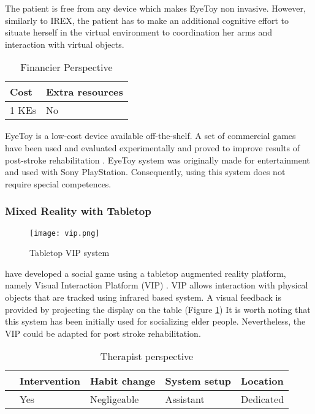 \documentclass[preprint,authoryear,12pt]{elsarticle}
\begin{document}
The patient is free from any device which makes EyeToy non invasive. However, similarly to IREX, the patient has to make an additional cognitive effort to situate herself in the virtual environment to coordination her arms and interaction with virtual objects.

\begin{table}[h]
\caption{Financier Perspective}
\center
\label{tab:finaper}
\begin{tabular}{|l|l|}
\hline
 Cost & Extra resources \\
\hline
 1 KEs &  No\\
\hline
\end{tabular}
\end{table}

EyeToy is a low-cost device available off-the-shelf. A set of commercial games have been used and evaluated experimentally and proved to improve results of post-stroke rehabilitation \citep{Yavuzer2008}. EyeToy system was originally made for entertainment and used with Sony PlayStation. Consequently, using this system does not require special competences.


\par
\subsubsection{Mixed Reality with Tabletop}
\par



\begin{figure}[h]
	\centering
\texttt{[image: vip.png]}
\caption{Tabletop VIP system \citep{AlMahmud2008}}
	\label{fig:vip}
\end{figure}
\citep{AlMahmud2008} have developed a social game using a tabletop augmented reality platform, namely Visual Interaction Platform (VIP) \citep{Aliakseyeu2001}. VIP allows interaction with physical objects that are tracked using infrared based system. A visual feedback is provided by projecting the display on the table (Figure \ref{fig:vip}) It is worth noting that this system has been initially used for socializing elder people. Nevertheless, the VIP could be adapted for post stroke rehabilitation.

\begin{table}[h]
\caption{Therapist perspective}
\center
\label{tab:theraper}
\begin{tabular}{|l|l|l|l|l|}
\hline
& Intervention & Habit change & System setup &	Location \\
\hline
\citep{AlMahmud2008} & Yes &  Negligeable	 & Assistant	 & Dedicated\\
\hline
\end{tabular}
\end{table}
\end{document}
